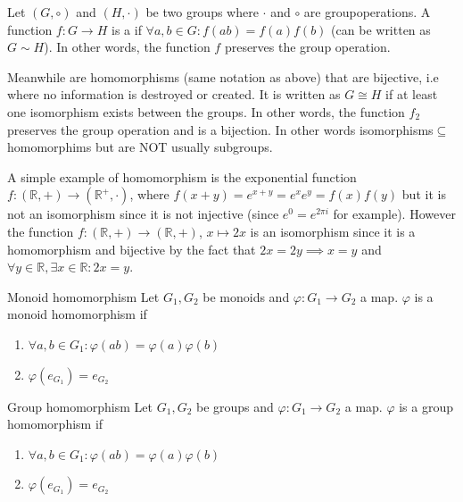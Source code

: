 \documentclass[a4paper]{article}
\begin{document}
\begin{aha}
    Let $(G, \circ)$ and $(H, \cdot)$ be two groups where $\cdot$ and $\circ$ are groupoperations. A function $f : G \to H$ is a  if $\forall a,b \in G : f(ab) = f(a)f(b)$ (can be written as $G\sim H$). In other words, the function $f$ preserves the group operation. 

    Meanwhile  are homomorphisms (same notation as above) that are bijective, i.e where no information is destroyed or created. It is written as $G \cong H$ if at least one isomorphism exists between the groups. In other words, the function $f_2$ preserves the group operation and is a bijection. In other words isomorphisms$\subseteq$ homomorphims but are NOT usually subgroups. 
    
    A simple example of homomorphism is the exponential function $f : (\mathbb{R}, +) \to (\mathbb{R}^+, \cdot)$, where $f(x+y) = e^{x+y} = e^x e^y = f(x)f(y)$ but it is not an isomorphism since it is not injective (since $e^0 = e^{2\pi i}$ for example). However the function $f : (\mathbb{R}, +) \to (\mathbb{R}, +)$, $x \mapsto 2x$ is an isomorphism since it is a homomorphism and bijective by the fact that $2x = 2y \implies x=y$ and $\forall y \in \mathbb{R}, \exists x \in \mathbb{R} : 2x = y$.
\end{aha}

\begin{defi}{Monoid homomorphism}
Let $G_1, G_2$ be monoids and $\varphi : G_1 \to G_2$ a map. $\varphi$ is a monoid homomorphism if
\begin{enumerate}[label=(\roman*)]
    \item $\forall a,b \in G_1 : \varphi(ab) = \varphi(a)\varphi(b)$
    \item $\varphi(e_{G_1}) = e_{G_2}$
\end{enumerate}
\end{defi}

\begin{defi}{Group homomorphism}
Let $G_1, G_2$ be groups and $\varphi : G_1 \to G_2$ a map. $\varphi$ is a group homomorphism if
\begin{enumerate}[label=(\roman*)]
    \item $\forall a,b \in G_1 : \varphi(ab) = \varphi(a)\varphi(b)$
    \item $\varphi(e_{G_1}) = e_{G_2}$
\end{enumerate}
\end{defi}
\end{document}
